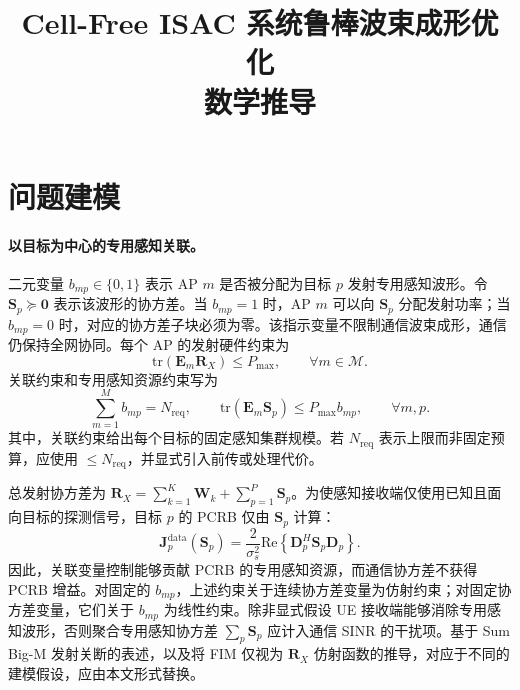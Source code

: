 \documentclass[12pt,a4paper]{article}
\title{\textbf{Cell-Free ISAC 系统鲁棒波束成形优化\\数学推导}}
\author{}
\date{}
\newcommand{\mat}[1]{\mathbf{#1}}
\newcommand{\tr}{\text{tr}}
\newcommand{\Real}{\text{Re}}
\begin{document}
\maketitle

\section{问题建模}\label{sec:formulation}

\paragraph{以目标为中心的专用感知关联。}
二元变量 $b_{mp}\in\{0,1\}$ 表示 AP $m$ 是否被分配为目标 $p$ 发射专用感知波形。令 $\mat{S}_p\succeq\mat{0}$ 表示该波形的协方差。当 $b_{mp}=1$ 时，AP $m$ 可以向 $\mat{S}_p$ 分配发射功率；当 $b_{mp}=0$ 时，对应的协方差子块必须为零。该指示变量不限制通信波束成形，通信仍保持全网协同。每个 AP 的发射硬件约束为
\begin{equation}
    \tr(\mat{E}_m\mat{R}_X)\leq P_{\max},\qquad \forall m\in\mathcal{M}.
\end{equation}
关联约束和专用感知资源约束写为
\begin{equation}
\sum_{m=1}^{M}b_{mp}=N_{\mathrm{req}},\qquad
\tr(\mat{E}_m\mat{S}_p)\leq P_{\max}b_{mp},\qquad \forall m,p.
\end{equation}
其中，关联约束给出每个目标的固定感知集群规模。若 $N_{\mathrm{req}}$ 表示上限而非固定预算，应使用 $\leq N_{\mathrm{req}}$，并显式引入前传或处理代价。

总发射协方差为 $\mat{R}_X=\sum_{k=1}^{K}\mat{W}_k+\sum_{p=1}^{P}\mat{S}_p$。为使感知接收端仅使用已知且面向目标的探测信号，目标 $p$ 的 PCRB 仅由 $\mat{S}_p$ 计算：
\begin{equation}\label{eq:clustered-fim}
 \mat{J}_p^{\mathrm{data}}(\mat{S}_p)
 =\frac{2}{\sigma_s^2}\Real\!\left\{\mat{D}_{p}^{H}\mat{S}_p\mat{D}_{p}\right\}.
\end{equation}
因此，关联变量控制能够贡献 PCRB 的专用感知资源，而通信协方差不获得 PCRB 增益。对固定的 $b_{mp}$，上述约束关于连续协方差变量为仿射约束；对固定协方差变量，它们关于 $b_{mp}$ 为线性约束。除非显式假设 UE 接收端能够消除专用感知波形，否则聚合专用感知协方差 $\sum_p\mat{S}_p$ 应计入通信 SINR 的干扰项。基于 Sum Big-M 发射关断的表述，以及将 FIM 仅视为 $\mat{R}_X$ 仿射函数的推导，对应于不同的建模假设，应由本文形式替换。
\end{document}
